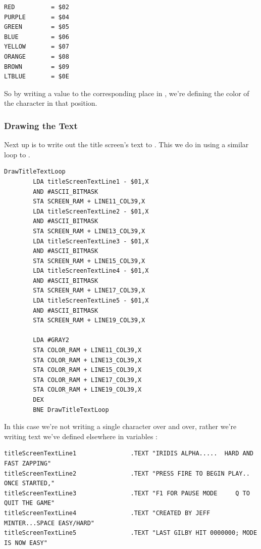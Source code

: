 \begin{lstlisting}[caption=In \icode{DrawStripesBehindTitle}]
RED          = $02
PURPLE       = $04
GREEN        = $05
BLUE         = $06
YELLOW       = $07
ORANGE       = $08
BROWN        = $09
LTBLUE       = $0E
\end{lstlisting}

So by writing a value to the corresponding place in , we're defining the color of the character
in that position.



\subsubsection{Drawing the Text}

Next up is to write out the title screen's text to . This we do in 
using a similar loop to . 

\begin{lstlisting}[caption=In \icode{DrawTitleScreenText}]
DrawTitleTextLoop   
        LDA titleScreenTextLine1 - $01,X
        AND #ASCII_BITMASK
        STA SCREEN_RAM + LINE11_COL39,X
        LDA titleScreenTextLine2 - $01,X
        AND #ASCII_BITMASK
        STA SCREEN_RAM + LINE13_COL39,X
        LDA titleScreenTextLine3 - $01,X
        AND #ASCII_BITMASK
        STA SCREEN_RAM + LINE15_COL39,X
        LDA titleScreenTextLine4 - $01,X
        AND #ASCII_BITMASK
        STA SCREEN_RAM + LINE17_COL39,X
        LDA titleScreenTextLine5 - $01,X
        AND #ASCII_BITMASK
        STA SCREEN_RAM + LINE19_COL39,X

        LDA #GRAY2
        STA COLOR_RAM + LINE11_COL39,X
        STA COLOR_RAM + LINE13_COL39,X
        STA COLOR_RAM + LINE15_COL39,X
        STA COLOR_RAM + LINE17_COL39,X
        STA COLOR_RAM + LINE19_COL39,X
        DEX
        BNE DrawTitleTextLoop
\end{lstlisting}

In this case we're not writing a single character over and over, rather we're writing text we've defined elsewhere
in variables :

\begin{lstlisting}[basicstyle=\tiny,caption=In \icode{DrawTitleScreenText}]
titleScreenTextLine1               .TEXT "IRIDIS ALPHA.....  HARD AND FAST ZAPPING"
titleScreenTextLine2               .TEXT "PRESS FIRE TO BEGIN PLAY.. ONCE STARTED,"
titleScreenTextLine3               .TEXT "F1 FOR PAUSE MODE     Q TO QUIT THE GAME"
titleScreenTextLine4               .TEXT "CREATED BY JEFF MINTER...SPACE EASY/HARD"
titleScreenTextLine5               .TEXT "LAST GILBY HIT 0000000; MODE IS NOW EASY"
\end{lstlisting}

